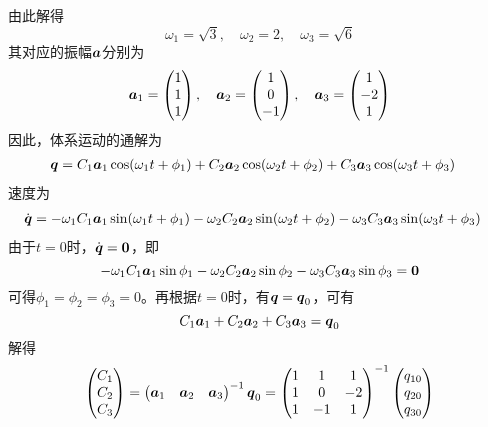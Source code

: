 \begin{solution}
\begin{equation*}
\end{equation*}
由此解得
\begin{equation*}
	\omega_1 = \sqrt{3},\quad \omega_2 = 2,\quad \omega_3 = \sqrt{6}
\end{equation*}
其对应的振幅$\boldsymbol{a}$分别为
\begin{equation*}
	\boldsymbol{a}_1 = \begin{pmatrix} 1 \\ 1 \\ 1 \end{pmatrix},\quad \boldsymbol{a}_2 = \begin{pmatrix} 1 \\ 0 \\ -1 \end{pmatrix},\quad \boldsymbol{a}_3 = \begin{pmatrix} 1 \\ -2 \\ 1 \end{pmatrix}
\end{equation*}
因此，体系运动的通解为
\begin{align*}
	\boldsymbol{q} & = C_1 \boldsymbol{a}_1 \cos(\omega_1 t + \phi_1) + C_2 \boldsymbol{a}_2 \cos(\omega_2 t + \phi_2) + C_3 \boldsymbol{a}_3 \cos(\omega_3 t + \phi_3)
\end{align*}
速度为
\begin{align*}
	\dot{\boldsymbol{q}} & = -\omega_1 C_1 \boldsymbol{a}_1 \sin(\omega_1 t + \phi_1) - \omega_2 C_2 \boldsymbol{a}_2 \sin(\omega_2 t + \phi_2) - \omega_3 C_3 \boldsymbol{a}_3 \sin(\omega_3 t + \phi_3)
\end{align*}
由于$t=0$时，$\dot{\boldsymbol{q}} = \boldsymbol{0}$，即
\begin{equation*}
	-\omega_1 C_1 \boldsymbol{a}_1 \sin \phi_1 - \omega_2 C_2 \boldsymbol{a}_2 \sin \phi_2 - \omega_3 C_3 \boldsymbol{a}_3 \sin \phi_3 = \boldsymbol{0}
\end{equation*}
可得$\phi_1 = \phi_2 = \phi_3 = 0$。再根据$t=0$时，有$\boldsymbol{q}= \boldsymbol{q}_0$，可有
\begin{equation*}
	C_1 \boldsymbol{a}_1 + C_2 \boldsymbol{a}_2 + C_3 \boldsymbol{a}_3 = \boldsymbol{q}_0
\end{equation*}
解得
\begin{align*}
	\begin{pmatrix} C_1 \\ C_2 \\ C_3 \end{pmatrix} & = \begin{pmatrix} \mbf{a}_1 & \mbf{a}_2 & \mbf{a}_3 \end{pmatrix}^{-1} \mbf{q}_0 = \begin{pmatrix} 1 & 1 & 1 \\ 1 & 0 & -2 \\ 1 & -1 & 1 \end{pmatrix}^{-1} \begin{pmatrix} q_{10} \\ q_{20} \\ q_{30} \end{pmatrix} \\

\end{align*}
\end{solution}
